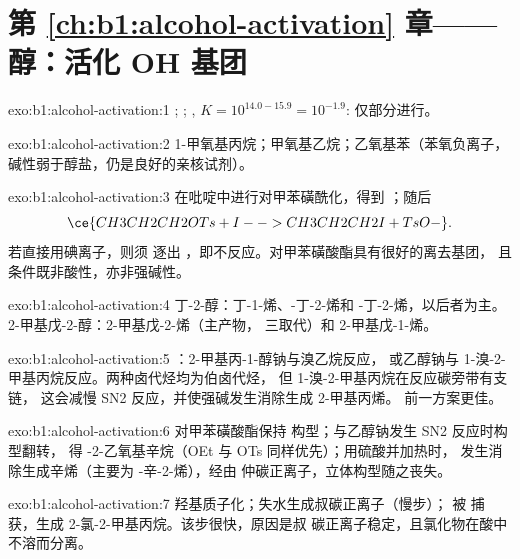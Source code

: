 \section*{第 \ref{ch:b1:alcohol-activation} 章——醇：活化 OH 基团}

\begin{solution}{exo:b1:alcohol-activation:1}
;
;
, $K = 10^{14.0 - 15.9} = 10^{-1.9}$:
仅部分进行。
\end{solution}

\begin{solution}{exo:b1:alcohol-activation:2}
1-甲氧基丙烷；甲氧基乙烷；乙氧基苯（苯氧负离子，
碱性弱于醇盐，仍是良好的亲核试剂）。
\end{solution}

\begin{solution}{exo:b1:alcohol-activation:3}
在吡啶中进行对甲苯磺酰化，得到 ；随后
\[ \ce{CH3CH2CH2OTs + I- -> CH3CH2CH2I + TsO-}. \] 若直接用碘离子，则须
逐出 ，即不反应。对甲苯磺酸酯具有很好的离去基团，
且条件既非酸性，亦非强碱性。
\end{solution}

\begin{solution}{exo:b1:alcohol-activation:4}
丁-2-醇：丁-1-烯、-丁-2-烯和
-丁-2-烯，以后者为主。2-甲基戊-2-醇：2-甲基戊-2-烯（主产物，
三取代）和 2-甲基戊-1-烯。
\end{solution}

\begin{solution}{exo:b1:alcohol-activation:5}
：2-甲基丙-1-醇钠与溴乙烷反应，
或乙醇钠与 1-溴-2-甲基丙烷反应。两种卤代烃均为伯卤代烃，
但 1-溴-2-甲基丙烷在反应碳旁带有支链，
这会减慢 SN2 反应，并使强碱发生消除生成 2-甲基丙烯。
前一方案更佳。
\end{solution}

\begin{solution}{exo:b1:alcohol-activation:6}
对甲苯磺酸酯保持  构型；与乙醇钠发生 SN2 反应时构型翻转，
得 -2-乙氧基辛烷（OEt 与 OTs 同样优先）；用硫酸并加热时，
发生消除生成辛烯（主要为 -辛-2-烯），经由
仲碳正离子，立体构型随之丧失。
\end{solution}

\begin{solution}{exo:b1:alcohol-activation:7}
羟基质子化；失水生成叔碳正离子（慢步）；
被  捕获，生成 2-氯-2-甲基丙烷。该步很快，原因是叔
碳正离子稳定，且氯化物在酸中不溶而分离。
\end{solution}

